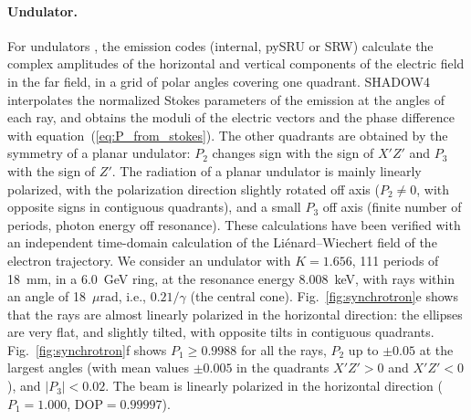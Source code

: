 \documentclass{iucr}
\begin{document}
\paragraph{Undulator.}
For undulators \cite{SanchezdelRio2025undulators}, the emission codes (internal, pySRU or SRW) calculate the complex amplitudes of the horizontal and vertical components of the electric field in the far field, in a grid of polar angles covering one quadrant. SHADOW4 interpolates the normalized Stokes parameters of the emission at the angles of each ray, and obtains the moduli of the electric vectors and the phase difference with equation~(\ref{eq:P_from_stokes}). The other quadrants are obtained by the symmetry of a planar undulator: $P_2$ changes sign with the sign of $X'Z'$ and $P_3$ with the sign of $Z'$. The radiation of a planar undulator is mainly linearly polarized, with the polarization direction slightly rotated off axis ($P_2\ne0$, with opposite signs in contiguous quadrants), and a small $P_3$ off axis (finite number of periods, photon energy off resonance). These calculations have been verified with an independent time-domain calculation of the Li\'enard--Wiechert field of the electron trajectory. We consider an undulator with $K=1.656$, 111 periods of 18~mm, in a 6.0~GeV ring, at the resonance energy 8.008~keV, with rays within an angle of 18~$\mu$rad, i.e., $0.21/\gamma$ (the central cone). Fig.~\ref{fig:synchrotron}e shows that the rays are almost linearly polarized in the horizontal direction: the ellipses are very flat, and slightly tilted, with opposite tilts in contiguous quadrants. Fig.~\ref{fig:synchrotron}f shows $P_1\ge0.9988$ for all the rays, $P_2$ up to $\pm0.05$ at the largest angles (with mean values $\pm0.005$ in the quadrants $X'Z'>0$ and $X'Z'<0$), and $|P_3|<0.02$. The beam is linearly polarized in the horizontal direction ($P_1=1.000$, DOP$=0.99997$).
\end{document}
